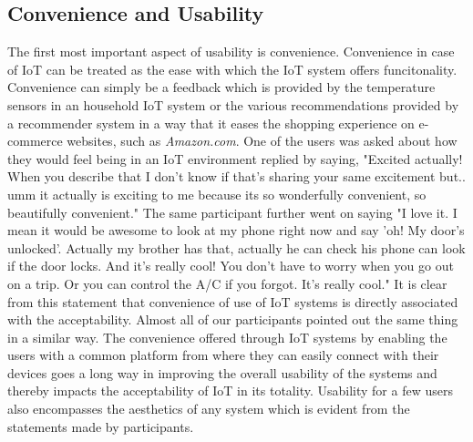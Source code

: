 \subsection{Convenience and Usability}
The first most important aspect of usability is convenience. Convenience in case of IoT can be treated as the ease with which the IoT system offers funcitonality. Convenience can simply be a feedback which is provided by the temperature sensors in an household IoT system or the various recommendations provided by a recommender system in a way that it eases the shopping experience on e-commerce websites, such as \textit{Amazon.com}. One of the users was asked about how they would feel being in an IoT environment replied by saying, "Excited actually! When you describe that I don't know if that's sharing your same excitement but.. umm it actually is exciting to me because its so wonderfully convenient, so beautifully convenient." The same participant further went on saying "I love it. I mean it would be awesome to look at my phone right now and say 'oh! My door's unlocked'. Actually my brother has that, actually he can check his phone can look if the door locks. And it's really cool! You don't have to worry when you go out on a trip. Or you can control the A/C if you forgot. It's really cool."  It is clear from this statement that convenience of use of IoT systems is directly associated with the acceptability. Almost all of our participants pointed out the same thing in a similar way. The convenience offered through IoT systems by enabling the users with a common platform from where they can easily connect with their devices goes a long way in improving the overall usability of the systems and thereby impacts the acceptability of IoT in its totality. Usability for a few users also encompasses the aesthetics of any system which is evident from the statements made by participants.

